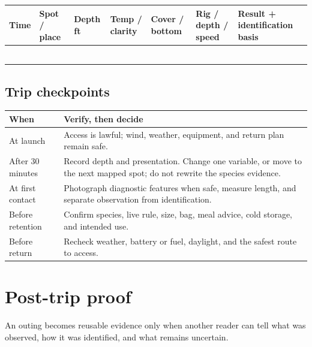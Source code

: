 {\scriptsize
\begin{tabularx}{\linewidth}{@{}p{.08\linewidth}p{.10\linewidth}p{.09\linewidth}
p{.11\linewidth}p{.12\linewidth}p{.13\linewidth}L@{}}
\toprule
Time & Spot / place & Depth ft & Temp / clarity & Cover / bottom &
Rig / depth / speed & Result + identification basis\\
\midrule
\rule{0pt}{3.3em}&&&&&&\\ \midrule
\rule{0pt}{3.3em}&&&&&&\\ \midrule
\rule{0pt}{3.3em}&&&&&&\\ \midrule
\rule{0pt}{3.3em}&&&&&&\\ \midrule
\rule{0pt}{3.3em}&&&&&&\\ \midrule
\rule{0pt}{3.3em}&&&&&&\\
\bottomrule
\end{tabularx}
\normalsize

\subsection*{Trip checkpoints}
\begin{tabularx}{\linewidth}{@{}p{.18\linewidth}L@{}}
\toprule
When & Verify, then decide\\
\midrule
At launch & Access is lawful; wind, weather, equipment, and return plan remain
safe.\\
After 30 minutes & Record depth and presentation. Change one variable, or move
to the next mapped spot; do not rewrite the species evidence.\\
At first contact & Photograph diagnostic features when safe, measure length,
and separate observation from identification.\\
Before retention & Confirm species, live rule, size, bag, meal advice, cold
storage, and intended use.\\
Before return & Recheck weather, battery or fuel, daylight, and the safest
route to access.\\
\bottomrule
\end{tabularx}

\clearpage
\section*{Post-trip proof}
An outing becomes reusable evidence only when another reader can tell what was
observed, how it was identified, and what remains uncertain.

}
